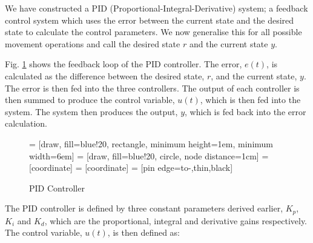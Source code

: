 \documentclass[12pt]{article}
\begin{document}
We have constructed a PID (Proportional-Integral-Derivative) system; a feedback control system which uses the error between the current state and the desired state to calculate the control parameters. We now generalise this for all possible movement operations and call the desired state $r$ and the current state $y$.

Fig. \ref{fig:pid} shows the feedback loop of the PID controller. The error, $e(t)$, is calculated as the difference between the desired state, $r$, and the current state, $y$. The error is then fed into the three controllers. The output of each controller is then summed to produce the control variable, $u(t)$, which is then fed into the system. The system then produces the output, $y$, which is fed back into the error calculation.

\begin{figure}[H]
    \centering
     = [draw, fill=blue!20, rectangle, 
    minimum height=1em, minimum width=6em]
     = [draw, fill=blue!20, circle, node distance=1cm]
     = [coordinate]
     = [coordinate]
     = [pin edge={to-,thin,black}]

    \caption{PID Controller}
    \label{fig:pid}
\end{figure}


The PID controller is defined by three constant parameters derived earlier, $K_p$, $K_i$ and $K_d$, which are the proportional, integral and derivative gains respectively. The control variable, $u(t)$, is then defined as:
\end{document}
